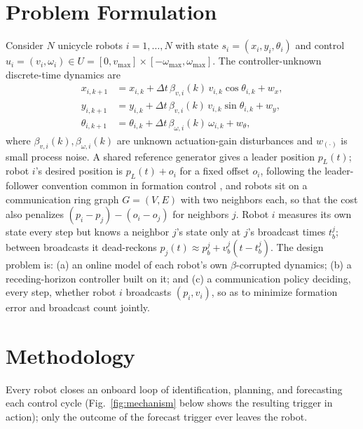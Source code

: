 \documentclass[10pt,conference]{IEEEtran}
\begin{document}
\section{Problem Formulation}

Consider $N$ unicycle robots $i=1,\dots,N$ with state $s_i=(x_i,y_i,\theta_i)$ and control $u_i=(v_i,\omega_i)\in U=[0,v_{\max}]\times[-\omega_{\max},\omega_{\max}]$. The controller-unknown discrete-time dynamics are
\begin{align}
x_{i,k+1} &= x_{i,k} + \Delta t\,\beta_{v,i}(k)\,v_{i,k}\cos\theta_{i,k} + w_x, \nonumber\\
y_{i,k+1} &= y_{i,k} + \Delta t\,\beta_{v,i}(k)\,v_{i,k}\sin\theta_{i,k} + w_y, \label{eq:truedyn}\\
\theta_{i,k+1} &= \theta_{i,k} + \Delta t\,\beta_{\omega,i}(k)\,\omega_{i,k} + w_\theta, \nonumber
\end{align}
where $\beta_{v,i}(k),\beta_{\omega,i}(k)$ are unknown actuation-gain disturbances and $w_{(\cdot)}$ is small process noise. A shared reference generator gives a leader position $p_L(t)$; robot $i$'s desired position is $p_L(t)+o_i$ for a fixed offset $o_i$, following the leader-follower convention common in formation control \cite{oh2015,lin2005}, and robots sit on a communication ring graph $G=(V,E)$ with two neighbors each, so that the cost also penalizes $(p_i-p_j)-(o_i-o_j)$ for neighbors $j$. Robot $i$ measures its own state every step but knows a neighbor $j$'s state only at $j$'s broadcast times $t_b^j$; between broadcasts it dead-reckons $p_j(t)\approx p_b^j+v_b^j(t-t_b^j)$. The design problem is: (a) an online model of each robot's own $\beta$-corrupted dynamics; (b) a receding-horizon controller built on it; and (c) a communication policy deciding, every step, whether robot $i$ broadcasts $(p_i,v_i)$, so as to minimize formation error and broadcast count jointly.

\section{Methodology}

Every robot closes an onboard loop of identification, planning, and forecasting each control cycle (Fig.~\ref{fig:mechanism} below shows the resulting trigger in action); only the outcome of the forecast trigger ever leaves the robot.
\end{document}
